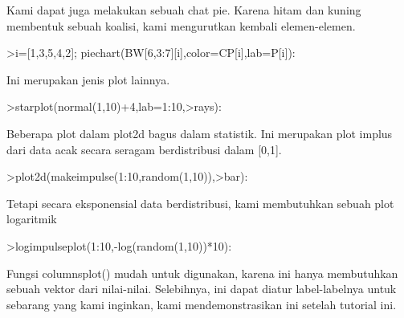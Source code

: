 \documentclass[a4paper,10pt]{article}
\begin{document}
\begin{eulernotebook}
\begin{eulercomment}
Kami dapat juga melakukan sebuah chat pie. Karena hitam dan kuning membentuk sebuah
koalisi, kami mengurutkan kembali elemen-elemen.
\end{eulercomment}
\begin{eulerprompt}
>i=[1,3,5,4,2]; piechart(BW[6,3:7][i],color=CP[i],lab=P[i]):
\end{eulerprompt}
\begin{eulercomment}
Ini merupakan jenis plot lainnya.
\end{eulercomment}
\begin{eulerprompt}
>starplot(normal(1,10)+4,lab=1:10,>rays):
\end{eulerprompt}
\begin{eulercomment}
Beberapa plot dalam plot2d bagus dalam statistik. Ini merupakan plot implus dari data acak
secara seragam berdistribusi dalam [0,1].
\end{eulercomment}
\begin{eulerprompt}
>plot2d(makeimpulse(1:10,random(1,10)),>bar):
\end{eulerprompt}
\begin{eulercomment}
Tetapi secara eksponensial data berdistribusi, kami membutuhkan sebuah plot logaritmik
\end{eulercomment}
\begin{eulerprompt}
>logimpulseplot(1:10,-log(random(1,10))*10):
\end{eulerprompt}
\begin{eulercomment}
Fungsi columnsplot() mudah untuk digunakan, karena ini hanya membutuhkan sebuah vektor
dari nilai-nilai. Selebihnya, ini dapat diatur label-labelnya untuk sebarang yang kami
inginkan, kami mendemonstrasikan ini setelah tutorial ini.


\end{eulercomment}
\end{eulernotebook}
\end{document}
